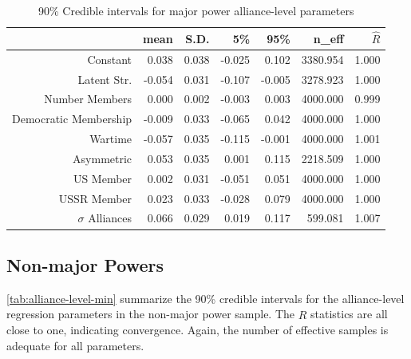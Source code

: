 \documentclass[12pt]{article}
\begin{document}
\begin{table}[ht]
\centering
\begin{tabular}{rrrrrrr}
  \hline
 & mean & S.D. & 5\% & 95\% & n\_eff & $\hat{R}$ \\ 
  \hline
Constant & 0.038 & 0.038 & -0.025 & 0.102 & 3380.954 & 1.000 \\ 
  Latent Str. & -0.054 & 0.031 & -0.107 & -0.005 & 3278.923 & 1.000 \\ 
  Number Members & 0.000 & 0.002 & -0.003 & 0.003 & 4000.000 & 0.999 \\ 
  Democratic Membership & -0.009 & 0.033 & -0.065 & 0.042 & 4000.000 & 1.000 \\ 
  Wartime & -0.057 & 0.035 & -0.115 & -0.001 & 4000.000 & 1.001 \\ 
  Asymmetric & 0.053 & 0.035 & 0.001 & 0.115 & 2218.509 & 1.000 \\ 
  US Member & 0.002 & 0.031 & -0.051 & 0.051 & 4000.000 & 1.000 \\ 
  USSR Member & 0.023 & 0.033 & -0.028 & 0.079 & 4000.000 & 1.000 \\ 
  $\sigma$ Alliances & 0.066 & 0.029 & 0.019 & 0.117 & 599.081 & 1.007 \\ 
   \hline
\end{tabular}
\caption{90\% Credible intervals for major power alliance-level parameters}
\label{tab:alliance-level-maj}
\end{table}



\subsection{Non-major Powers} 

\autoref{tab:alliance-level-min} summarize the 90\% credible intervals for the alliance-level regression parameters in the non-major power sample. 
The $\hat{R}$ statistics are all close to one, indicating convergence. 
Again, the number of effective samples is adequate for all parameters.
\end{document}
